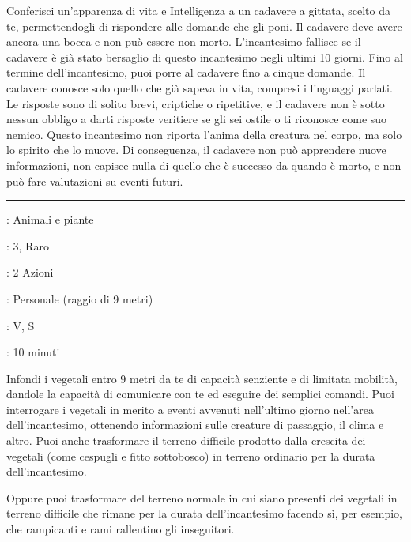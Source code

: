 \begin{multicols}{2}
Conferisci un'apparenza di vita e Intelligenza a un cadavere a gittata, scelto da te, permettendogli di rispondere alle domande che gli poni. Il cadavere deve avere ancora una bocca e non può essere non morto. L'incantesimo fallisce se il cadavere è già stato bersaglio di questo incantesimo negli ultimi 10 giorni. Fino al termine dell'incantesimo, puoi porre al cadavere fino a cinque domande. Il cadavere conosce solo quello che già sapeva in vita, compresi i linguaggi parlati. Le risposte sono di solito brevi, criptiche o ripetitive, e il cadavere non è sotto nessun obbligo a darti risposte veritiere se gli sei ostile o ti riconosce come suo nemico. Questo incantesimo non riporta l'anima della creatura nel corpo, ma solo lo spirito che lo muove. Di conseguenza, il cadavere non può apprendere nuove informazioni, non capisce nulla di quello che è successo da quando è morto, e non può fare valutazioni su eventi futuri.

\smallskip\noindent\rule{\linewidth}{2pt} \hypertarget{Parlare con le Piante}{}\medskip{}
\noindent
\begin{description}[noitemsep, topsep=0pt, parsep=0pt, partopsep=0pt, leftmargin=0cm, labelwidth=2.8cm]
	\item[\textbf{Lista di Magia}]: Animali e piante
	\item[\textbf{Livello}]: 3, Raro
	\item[\textbf{T. di Lancio}]: 2 Azioni
	\item[\textbf{Gittata}]: Personale (raggio di 9 metri)
	\item[\textbf{Componenti}]: V, S
	\item[\textbf{Durata}]: 10 minuti
\end{description}

Infondi i vegetali entro 9 metri da te di capacità senziente e di limitata mobilità, dandole la capacità di comunicare con te ed eseguire dei semplici comandi. Puoi interrogare i vegetali in merito a eventi avvenuti nell'ultimo giorno nell'area dell'incantesimo, ottenendo informazioni sulle creature di passaggio, il clima e altro. Puoi anche trasformare il terreno difficile prodotto dalla crescita dei vegetali (come cespugli e fitto sottobosco) in terreno ordinario per la durata dell'incantesimo.

Oppure puoi trasformare del terreno normale in cui siano presenti dei vegetali in terreno difficile che rimane per la durata dell'incantesimo facendo sì, per esempio, che rampicanti e rami rallentino gli inseguitori.


\end{multicols}
